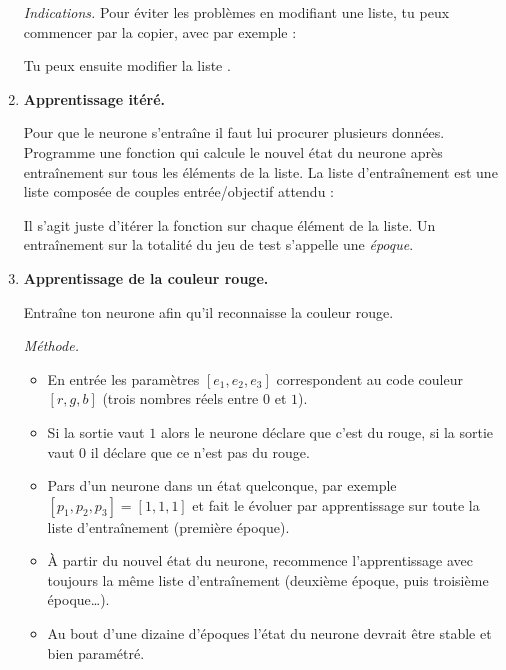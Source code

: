 \documentclass[11pt,class=report,crop=false]{standalone}
\begin{document}
\begin{activite}[Neurone]
\begin{enumerate}
\begin{itemize}
	\end{itemize}	
		
	
	\emph{Indications.} Pour éviter les problèmes en modifiant une liste, tu peux commencer par la copier, avec par exemple :	
	
	Tu peux ensuite modifier la liste .
	
	\item  \textbf{Apprentissage itéré.}
	
	Pour que le neurone s'entraîne il faut lui procurer plusieurs données.
	Programme une fonction 
	qui calcule le nouvel état du neurone après entraînement sur tous les éléments de la liste.
	La liste d'entraînement est une liste composée de couples entrée/objectif attendu : 	
	\mycenterline{\ci{[ ([1,0,0],1), ([0,1,1],0), ([0,1,0],0), ... ]}}
	
	Il s'agit juste d'itérer la fonction  sur chaque élément de la liste. 
	Un entraînement sur la totalité du jeu de test s'appelle une \emph{époque}.
	
	\item  \textbf{Apprentissage de la couleur rouge.}
	
	Entraîne ton neurone afin qu'il reconnaisse la couleur rouge.
	
\medskip
	
	\emph{Méthode.}
	\begin{itemize}
		\item En entrée les paramètres $[e_1,e_2,e_3]$ correspondent au code couleur $[r,g,b]$ (trois nombres réels entre $0$ et $1$).
		\item Si la sortie vaut $1$ alors le neurone déclare que c'est du rouge, si la sortie vaut $0$ il déclare que ce n'est pas du rouge.
		\item Pars d'un neurone dans un état quelconque, par exemple $[p_1,p_2,p_3]=[1,1,1]$ et fait le évoluer par apprentissage sur toute la liste d'entraînement (première époque).
		\item \`A partir du nouvel état du neurone, recommence l'apprentissage avec toujours la même liste d'entraînement (deuxième époque, puis troisième époque\ldots). 
		\item Au bout d'une dizaine d'époques l'état du neurone devrait être stable et bien paramétré.
	\end{itemize}

\medskip


\end{enumerate}
\end{activite}
\end{document}
